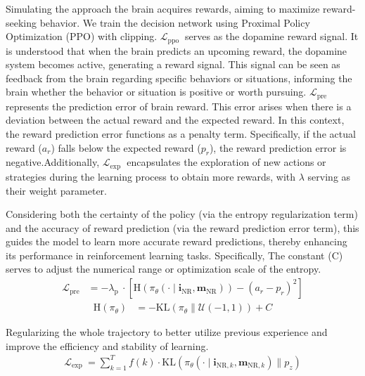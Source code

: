 Simulating the approach the brain acquires rewards, aiming to maximize reward-seeking behavior. We train the decision network using Proximal Policy Optimization (PPO) \cite{schulman2017proximal} with clipping. $\mathcal{L}_{\text {ppo }}$ serves as the dopamine reward signal. It is understood that when the brain predicts an upcoming reward, the dopamine system becomes active, generating a reward signal. This signal can be seen as feedback from the brain regarding specific behaviors or situations, informing the brain whether the behavior or situation is positive or worth pursuing. $\mathcal{L}_{\text {pre }}$ represents the prediction error of brain reward. This error arises when there is a deviation between the actual reward and the expected reward. In this context, the reward prediction error functions as a penalty term. Specifically, if the actual reward ($a_{r}$) falls below the expected reward ($p_{r}$), the reward prediction error is negative.Additionally, $\mathcal{L}_{\text {exp }}$ encapsulates the exploration of new actions or strategies during the learning process to obtain more rewards, with $\lambda$ serving as their weight parameter.

Considering both the certainty of the policy (via the entropy regularization term) and the accuracy of reward prediction (via the reward prediction error term), this guides the model to learn more accurate reward predictions, thereby enhancing its performance in reinforcement learning tasks. Specifically, The constant (C) serves to adjust the numerical range or optimization scale of the entropy.
\begin{align}
	\mathcal{L}_{\text{pre}} & = -\lambda_{\text {p }} \cdot [\mathrm{H}\left(\pi_{\theta}\left(\cdot \mid \mathbf{i}_{\mathrm{NR}}, \mathbf{m}_{\mathrm{NR}}\right)\right) - (a_{r} - p_{r})^{2}]
\end{align}
\begin{align}
	\mathrm{H}\left(\pi_{\theta}\right) & = -\mathrm{KL}\left(\pi_{\theta} \| \mathcal{U}(-1,1)\right)+C
\end{align}

Regularizing the whole trajectory to better utilize previous experience and improve the efficiency and stability of learning.
\begin{align}
    \mathcal{L}_{\text {exp }}=\sum_{k=1}^{T} f(k) \cdot \mathrm{KL}\left(\pi_{\theta}\left(\cdot \mid \mathbf{i}_{\mathrm{NR}, k}, \mathbf{m}_{\mathrm{NR}, k}\right) \| p_{z}\right)
\end{align}

